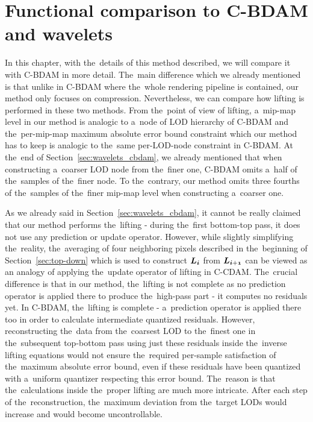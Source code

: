\chapter{Functional comparison to C-BDAM and wavelets}\label{chap:cbdam_comp}

In this chapter, with the~details of this method described, we will compare it with C-BDAM in more detail. The~main difference which we already mentioned is that unlike in C-BDAM where the~whole rendering pipeline is contained, our method only focuses on compression. Nevertheless, we can compare how lifting is performed in these two methods. From the~point of view of lifting, a~mip-map level in our method is analogic to a~node of LOD hierarchy of C-BDAM and the~per-mip-map maximum absolute error bound constraint which our method has to keep is analogic to the~same per-LOD-node constraint in C-BDAM. At the~end of Section~\ref{sec:wavelets_cbdam}, we already mentioned that when constructing a~coarser LOD node from the~finer one, C-BDAM omits a~half of the~samples of the~finer node. To the~contrary, our method omits three fourths of the~samples of the~finer mip-map level when constructing a~coarser one. 

As we already said in Section~\ref{sec:wavelets_cbdam}, it cannot be really claimed that our method performs the~lifting - during the~first bottom-top pass, it does not use any prediction or update operator. However, while slightly simplifying the~reality, the~averaging of four neighboring pixels described in the~beginning of Section~\ref{sec:top-down} which is used to construct $\lnorm{i}$ from $\lnorm{i+1}$ can be viewed as an analogy of applying the~update operator of lifting in C-CDAM. The~crucial difference is that in our method, the~lifting is not complete as no prediction operator is applied there to produce the~high-pass part - it computes no residuals yet. In C-BDAM, the~lifting is complete - a~prediction operator is applied there too in order to calculate intermediate quantized residuals. However, reconstructing the~data from the~coarsest LOD to the~finest one in the~subsequent top-bottom pass using just these residuals inside the~inverse lifting equations would not ensure the~required per-sample satisfaction of the~maximum absolute error bound, even if these residuals have been quantized with a~uniform quantizer respecting this error bound. The~reason is that the~calculations inside the~proper lifting are much more intricate. After each step of the~reconstruction, the~maximum deviation from the~target LODs would increase and would become uncontrollable. 

